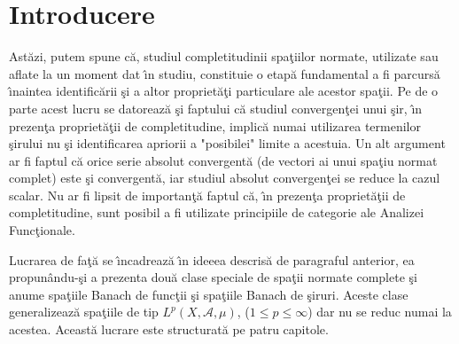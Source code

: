 \documentclass[12pt,a4paper]{book}
\begin{document}
\makeatletter

\section*{Introducere}
\vspace{10 mm}

Ast\u azi, putem spune c\u a, studiul completitudinii spa\c tiilor normate, utilizate sau aflate la un moment dat \^\i n studiu, constituie o etap\u a fundamental a fi parcurs\u a \^\i naintea identific\u arii \c si a altor propriet\u a\c ti particulare ale acestor spa\c tii. Pe de o parte acest lucru se datoreaz\u a  \c si faptului c\u a studiul convergen\c tei unui \c sir, \^\i n prezen\c ta propriet\u a\c tii de completitudine, implic\u a numai utilizarea termenilor \c sirului nu \c si identificarea apriorii a "posibilei" limite a acestuia. Un alt argument ar fi faptul c\u a orice serie absolut convergent\u a (de vectori ai unui spa\c tiu normat complet) este \c si convergent\u a, iar studiul absolut convergen\c tei se reduce la cazul scalar. Nu ar fi lipsit de importan\c t\u a faptul c\u a, \^\i n prezen\c ta  propriet\u a\c tii de completitudine, sunt posibil a fi utilizate principiile de categorie ale Analizei Func\c tionale.

Lucrarea de fa\c t\u a se \^\i ncadreaz\u a \^\i n ideeea descris\u a de paragraful anterior, ea propun\^ andu-\c si a prezenta dou\u a clase speciale de spa\c tii normate complete \c si anume spa\c tiile Banach de func\c tii \c si spa\c tiile Banach de \c siruri. Aceste clase generalizeaz\u a  spa\c tiile de tip $L^p(X, \mathcal{A}, \mu)$, ($1 \leq p \leq \infty$) dar nu se reduc numai la acestea. Aceast\u a lucrare este structurat\u a pe patru capitole.
\end{document}
